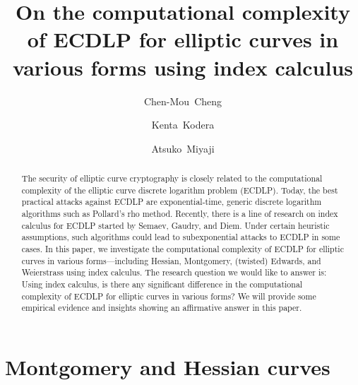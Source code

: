 \documentclass{llncs}
\begin{document}
%
\title{On the computational complexity of ECDLP for elliptic curves in
  various forms using index calculus}
%
%
\author{Chen-Mou~Cheng \and Kenta~Kodera \and Atsuko~Miyaji}
%
%

\maketitle              %

\begin{abstract}
%
  The security of elliptic curve cryptography is closely related to
  the computational complexity of the elliptic curve discrete
  logarithm problem (ECDLP).
%
  Today, the best practical attacks against ECDLP are
  exponential-time, generic discrete logarithm algorithms such as
  Pollard's rho method.
%
  Recently, there is a line of research on index calculus for ECDLP
  started by Semaev, Gaudry, and
  Diem.
%
  Under certain heuristic assumptions, such algorithms could lead to
  subexponential attacks to ECDLP in some
  cases.
%
  In this paper, we investigate the computational complexity of ECDLP
  for elliptic curves in various forms---including
  Hessian,
  Montgomery, (twisted)
  Edwards,
  and Weierstrass using index calculus.
%
  The research question we would like to answer is: Using index
  calculus, is there any significant difference in the computational
  complexity of ECDLP for elliptic curves in various forms?
%
  We will provide some empirical evidence and insights showing an
  affirmative answer in this paper.
%
\end{abstract}



\section{Montgomery and Hessian curves}
\label{sec:montgomery-hessian}





\end{document}
